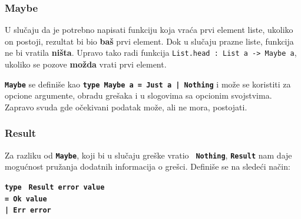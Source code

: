 \documentclass[12pt,oneside]{memoir}
\begin{document}
\subsubsection{Maybe}
U slučaju da je potrebno napisati funkciju koja vraća prvi element liste, ukoliko on
postoji, rezultat bi bio \textbf{baš} prvi element. Dok u slučaju prazne liste, funkcija ne
bi vratila \textbf{ništa}. Upravo tako radi funkcija \texttt{List.head : List a -> Maybe a}, 
ukoliko se pozove \textbf{možda} vrati prvi element.

\texttt{\textbf{Maybe}} se definiše kao \texttt{\textbf{type Maybe a = Just a | Nothing}}
i može se koristiti za opcione argumente, obradu grešaka i u slogovima sa opcionim svojstvima.
Zapravo svuda gde očekivani podatak može, ali ne mora, postojati.

\subsubsection{Result}
Za razliku od \texttt{\textbf{Maybe}}, koji bi u slučaju greške vratio \texttt{
\textbf{Nothing}}, \texttt{\textbf{Result}} nam daje mogućnost pružanja dodatnih 
informacija o grešci. Definiše se na sledeći način: \begin{tabbing}
\texttt{\textbf{type}} \= \texttt{\textbf{ Result error value}} \\
\> \=  \texttt{\textbf{= Ok value}} \\\>
\> \texttt{\textbf{| Err error }}
\end{tabbing}
\end{document}
